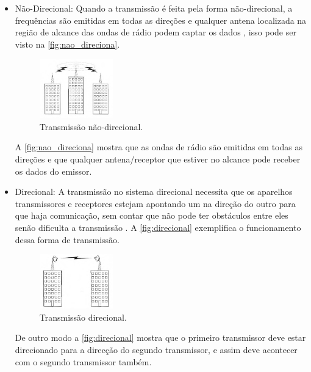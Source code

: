         \begin{itemize}
        \item{Não-Direcional: }
        Quando a transmissão é feita pela forma não-direcional, a frequências são emitidas em todas as direções e qualquer antena localizada na região de alcance das ondas de rádio podem captar os dados \cite{torres2001}, isso pode ser visto na \autoref{fig:nao_direciona}.
            \begin{figure}[H]
              \caption{\label{fig:nao_direciona}{Transmissão não-direcional.}}
              \centering
              \includegraphics[width=0.3\textwidth]{Figuras/transmissao_radio_nao_direcional.PNG}
            \end{figure}
        \par
        A  \autoref{fig:nao_direciona} mostra que as ondas de rádio são emitidas em todas as direções e que qualquer antena/receptor que estiver no alcance pode receber os dados do emissor.
        
        \item{Direcional: }
        A transmissão no sistema direcional necessita que os aparelhos transmissores e receptores estejam apontando um na direção do outro para que haja comunicação, sem contar que não pode ter obstáculos entre eles senão dificulta a transmissão \cite{torres2001}. A \autoref{fig:direcional} exemplifica o funcionamento dessa forma de transmissão.

        \begin{figure}[H]
              \caption{\label{fig:direcional}{Transmissão direcional.}}
              \centering
              \includegraphics[width=0.3\textwidth]{Figuras/transmissao_radio_direcional.PNG}
        \end{figure}
        \par
        De outro modo a \autoref{fig:direcional} mostra que o primeiro transmissor deve estar direcionado para a direcção do segundo transmissor, e assim deve acontecer com o segundo transmissor também.
        \end{itemize}    
